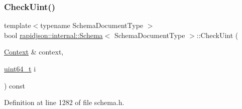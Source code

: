 \mbox{\label{classrapidjson_1_1internal_1_1_schema_ade6cff392d601ee17025e327f54a0c2d}} 
\subsubsection{\texorpdfstring{CheckUint()}{CheckUint()}}
{\footnotesize\ttfamily template$<$typename Schema\+Document\+Type $>$ \\
bool \mbox{\hyperlink{classrapidjson_1_1internal_1_1_schema}{rapidjson\+::internal\+::\+Schema}}$<$ Schema\+Document\+Type $>$\+::Check\+Uint (\begin{DoxyParamCaption}\item[{\mbox{\hyperlink{classrapidjson_1_1internal_1_1_schema_afca06b1f51d1bc18403bdf3f4d55ffef}{Context}} \&}]{context,  }\item[{\mbox{\hyperlink{stdint_8h_aec6fcb673ff035718c238c8c9d544c47}{uint64\+\_\+t}}}]{i }\end{DoxyParamCaption}) const\hspace{0.3cm}{\ttfamily [private]}}



Definition at line 1282 of file schema.\+h.



